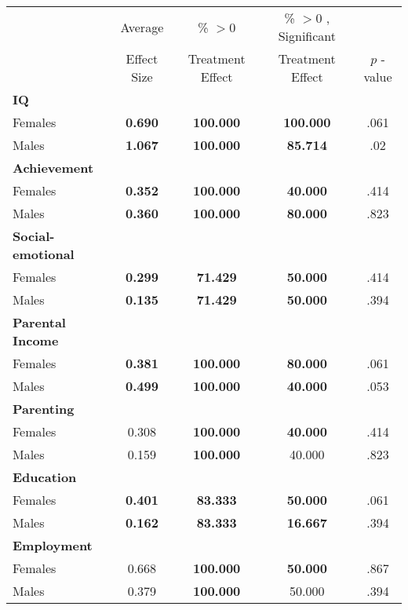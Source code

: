 \begin{tabular}{l c c c c}
\toprule
 & Average & \% $ >0 $ & \% $ >0 $ , Significant & \citet{Rosenbaum_2005_Distribution_JRSS} \\
 & Effect Size & Treatment Effect & Treatment Effect & $ p $ -value \\
\midrule
\textbf{IQ} & & & & \\
\quad Females &  \textbf{    0.690} & \textbf{  100.000} & \textbf{  100.000} & .061 \\
\quad Males &  \textbf{    1.067} & \textbf{  100.000} & \textbf{   85.714} & .02 \\
\midrule
\textbf{Achievement} & & & & \\
\quad Females &  \textbf{    0.352} & \textbf{  100.000} & \textbf{   40.000} & .414 \\
\quad Males &  \textbf{    0.360} & \textbf{  100.000} & \textbf{   80.000} & .823 \\
\midrule
\textbf{Social-emotional} & & & & \\
\quad Females &  \textbf{    0.299} & \textbf{   71.429} & \textbf{   50.000} & .414 \\
\quad Males &  \textbf{    0.135} & \textbf{   71.429} & \textbf{   50.000} & .394 \\
\midrule
\textbf{Parental Income} & & & & \\
\quad Females &  \textbf{    0.381} & \textbf{  100.000} & \textbf{   80.000} & .061 \\
\quad Males &  \textbf{    0.499} & \textbf{  100.000} & \textbf{   40.000} & .053 \\
\midrule
\textbf{Parenting} & & & & \\
\quad Females &      0.308 & \textbf{  100.000} & \textbf{   40.000} & .414 \\
\quad Males &      0.159 & \textbf{  100.000} &    40.000 & .823 \\
\midrule
\textbf{Education} & & & & \\
\quad Females &  \textbf{    0.401} & \textbf{   83.333} & \textbf{   50.000} & .061 \\
\quad Males &  \textbf{    0.162} & \textbf{   83.333} & \textbf{   16.667} & .394 \\
\midrule
\textbf{Employment} & & & & \\
\quad Females &      0.668 & \textbf{  100.000} & \textbf{   50.000} & .867 \\
\quad Males &      0.379 & \textbf{  100.000} &    50.000 & .394 \\

\end{tabular}
